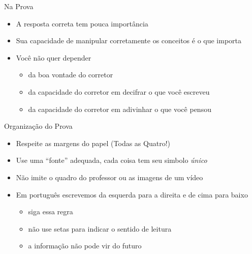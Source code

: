 \begin{frame}{Na Prova}
  \begin{itemize}[<+->]
    \item A resposta correta tem pouca importância
    \item Sua capacidade de manipular corretamente os conceitos é o que importa
    \item Você não quer depender
    \begin{itemize}
      \item da boa vontade do corretor
      \item da capacidade do corretor em decifrar o que você escreveu
      \item da capacidade do corretor em adivinhar o que você pensou
    \end{itemize}
  \end{itemize}
\end{frame}

\begin{frame}{Organização do Prova}
  \begin{itemize}[<+->]
    \item Respeite as margens do papel (Todas as Quatro!)
    \item Use uma ``fonte'' adequada, cada coisa tem seu simbolo \emph{único}
    \item Não imite o quadro do professor ou as imagens de um vídeo
    \item Em português escrevemos da esquerda para a direita e de cima para baixo
    \begin{itemize}
      \item siga essa regra
      \item não use setas para indicar o sentido de leitura
      \item a informação não pode vir do futuro
    \end{itemize}
  \end{itemize}
\end{frame}

